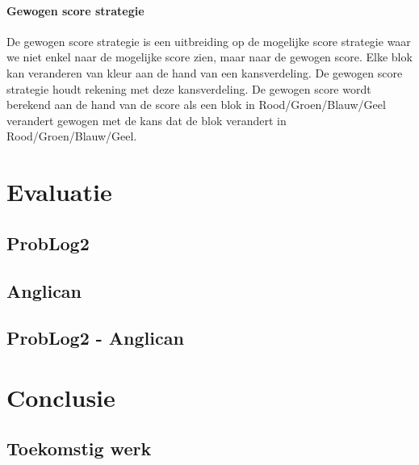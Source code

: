 \documentclass[12pt,a4paper,oneside]{book}
\theoremstyle{definition}
\begin{document}
\subsubsection{Gewogen score strategie}
De gewogen score strategie is een uitbreiding op de mogelijke score strategie waar we niet enkel naar de mogelijke score zien, maar naar de gewogen score. Elke blok kan veranderen van kleur aan de hand van een kansverdeling. De gewogen score strategie houdt rekening met deze kansverdeling. De gewogen score wordt berekend aan de hand van de score als een blok in Rood/Groen/Blauw/Geel verandert gewogen met de kans dat de blok verandert in Rood/Groen/Blauw/Geel.

\chapter{Evaluatie}
\label{ch:evaluatie}
\section{ProbLog2}
\label{sec:evaluatieProbLog2}
\section{Anglican}
\label{sec:evaluatieAnglican}
\section{ProbLog2 - Anglican}
\label{sec:evaluatieProbLog2Anglican}

\chapter{Conclusie}
\section{Toekomstig werk}



\end{document}
